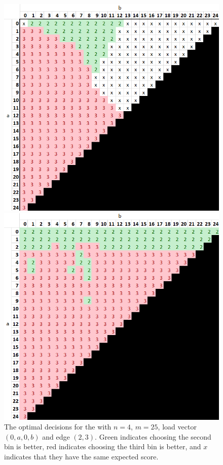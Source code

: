 \begin{figure}
\centering
\begin{minipage}[t]{.48\linewidth}
  \centering
  \includegraphics[scale=0.45]{Chapter4/Figs/0a0b_4_25_analysis.png}
  \caption{The optimal decisions for the \CycleGraph with $n=4$, $m=25$, load vector $(0,a,0,b)$ and edge $(2,3)$. Green indicates choosing the second bin is better, red indicates choosing the third bin is better, and $x$ indicates that they have the same expected score.}
  \label{greedy-counterexample-analysed}
\end{minipage}\hfill
\begin{minipage}[t]{.48\linewidth}
  \centering
  \includegraphics[scale=0.45]{Chapter4/Figs/0a0b_4_25_analysis_dqn.png}

\end{minipage}
\end{figure}
